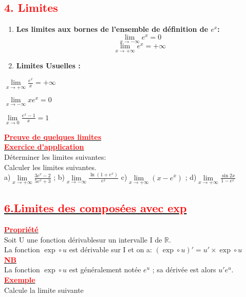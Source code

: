 \documentclass[12pt,a4paper]{article}
\begin{document}
\subsection*{\textbf{\textcolor{red}{4. Limites }}}

\begin{enumerate}[label=(\alph*)]
    \item \textbf{Les limites aux bornes de l'ensemble de définition de \( e^x \):}
    \[
    \lim_{x \to -\infty} e^x = 0
    \]
    \[
    \lim_{x \to +\infty} e^x = +\infty
    \]

    \item \textbf{Limites Usuelles :}

\end{enumerate}

\(
\lim\limits_{x \to +\infty} \frac{e^x}{x} = +\infty
\)

$\lim\limits_{x \to -\infty}xe^{x}=0$

$\lim\limits_{x \to 0}\frac{e^{x}-1}{x}=1$

\underline{\textbf{\textcolor{red}{Preuve de quelques limites}}}\\

\underline{\textbf{\textcolor{red}{Exercice d'application}}}\\
Déterminer les limites suivantes:\\
Calculer les limites suivantes.\\
a)\( \lim\limits_{x \to +\infty}\frac{3e^{x}-2}{5e^{x}+3}\) ; b)\(\lim\limits_{x \to -\infty}\frac{\ln(1+e^{x})}{e^{x}}\)
c)\( \lim\limits_{x \to +\infty}(x-e^{x})\) ; d)\( \lim\limits_{x \to +\infty}\frac{\sin2x}{1-e^{x}}\)
\subsection*{\underline{\textbf{\textcolor{red}{6.Limites des composées avec exp}}}}
\underline{\textbf{\textcolor{red}{Propriété}}}\\
Soit U une fonction dérivablesur un intervalle I de $\mathbb{R}$.\\
La fonction $\exp\circ u $ est dérivable sur I  et on a: $(\exp\circ u )'=u' \times \exp\circ u$\\
\underline{\textbf{\textcolor{red}{NB}}}\\
La fonction $\exp\circ u $ est généralement notée $e^{u}$ ; sa dérivée est alors $u'e^{u}$.\\
\underline{\textbf{\textcolor{red}{Exemple}}}\\
Calcule la limite suivante\\
\end{document}
